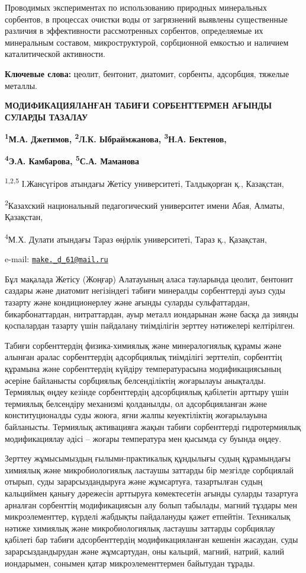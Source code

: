 Проводимых экспериментах по использованию природных минеральных
сорбентов, в процессах очистки воды от загрязнений выявлены существенные
различия в эффективности рассмотренных сорбентов, определяемые их
минеральным составом, микроструктурой, сорбционной емкостью и наличием
каталитической активности.

{\bfseries Ключевые слова:} цеолит, бентонит, диатомит, сорбенты,
адсорбция, тяжелые металлы.

{\bfseries МОДИФИКАЦИЯЛАНҒАН ТАБИҒИ СОРБЕНТТЕРМЕН АҒЫНДЫ СУЛАРДЫ ТАЗАЛАУ}

{\bfseries \textsuperscript{1}М.А. Джетимов\textsuperscript{\envelope },
\textsuperscript{2}Л.К. Ыбраймжанова, \textsuperscript{3}Н.А. Бектенов,}

{\bfseries \textsuperscript{4}Э.А. Камбарова, \textsuperscript{5}С.А.
Маманова}

\textsuperscript{1,2,5} І.Жансүгіров атындағы Жетісу университеті,
Талдықорған қ., Казақстан,

\textsuperscript{2}Казахский национальный педагогический университет
имени Абая, Алматы, Қазақстан,

\textsuperscript{4}М.Х. Дулати атындағы Тараз өңірлік университеті,
Тараз қ., Қазақстан,

e-mail:
\href{mailto:make._d_61@mail.ru}{\nolinkurl{make.\_d\_61@mail.ru}}

Бұл мақалада Жетісу (Жоңғар) Алатауының аласа тауларында цеолит,
бентонит саздары және диатомит негізіндегі табиғи минералды сорбенттерді
ауыз суды тазарту және кондиционерлеу және ағынды суларды сульфаттардан,
бикарбонаттардан, нитраттардан, ауыр металл иондарынан және басқа да
зиянды қоспалардан тазарту үшін пайдалану тиімділігін зерттеу нәтижелері
келтірілген.

Табиғи сорбенттердің физика-химиялық және минералогиялық құрамы және
алынған аралас сорбенттердің адсорбциялық тиімділігі зерттеліп,
сорбенттің құрамына және сорбенттердің күйдіру температурасына
модификациясының әсеріне байланысты сорбциялық белсенділіктің жоғарылауы
анықталды. Термиялық өңдеу кезінде сорбенттердің адсорбциялық қабілетін
арттыру үшін термиялық белсендіру механизмі қолданылды, ол
адсорбцияланған және конституционалды суды жоюға, яғни жалпы
кеуектіліктің жоғарылауына байланысты. Термиялық активацияға жақын
табиғи сорбенттерді гидротермиялық модификациялау әдісі -- жоғары
температура мен қысымда су буында өңдеу.

Зерттеу жұмысымыздың ғылыми-практикалық құндылығы судың құрамындағы
химиялық және микробиологиялық ластаушы заттарды бір мезгілде сорбциялай
отырып, суды зарарсыздандыруға және жұмсартуға, тазартылған судың
кальциймен қанығу дәрежесін арттыруға көмектесетін ағынды суларды
тазартуға арналған сорбенттің модификациясын алу болып табылады, магний
тұздары мен микроэлементтер, күрделі жабдықты пайдалануды қажет
етпейтін. Техникалық нәтиже химиялық және микробиологиялық ластаушы
заттарды сорбциялау қабілеті бар табиғи адсорбенттердің
модификацияланған кешенін жасаудан, суды зарарсыздандырудан және
жұмсартудан, оны кальций, магний, натрий, калий иондарымен, сонымен
қатар микроэлементтермен байытудан тұрады.

